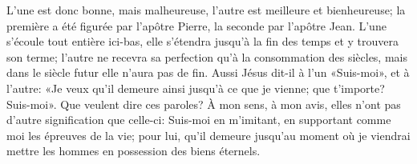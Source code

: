 L’une est donc bonne, mais malheureuse,
	l’autre est meilleure et bienheureuse;
	la première a été figurée par l’apôtre Pierre,
	la seconde par l’apôtre Jean.
L’une s’écoule tout entière ici-bas,
	elle s’étendra jusqu’à la fin des temps et y trouvera son terme;
	l’autre ne recevra sa perfection qu’à la consommation des siècles,
	mais dans le siècle futur elle n’aura pas de fin.
Aussi Jésus dit-il à l’un «Suis-moi»,
	et à l’autre: «Je veux qu’il demeure ainsi jusqu’à ce que je vienne;
	que t’importe? Suis-moi».
Que veulent dire ces paroles?
À mon sens, à mon avis, elles n’ont pas d’autre signification que celle-ci:
	Suis-moi en m’imitant, en supportant comme moi les épreuves de la vie;
	pour lui, qu’il demeure jusqu’au moment
		où je viendrai mettre les hommes en possession des biens éternels.
